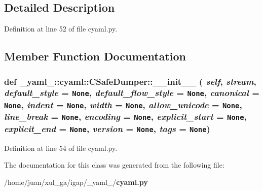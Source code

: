 \subsection{Detailed Description}


Definition at line 52 of file cyaml.py.

\subsection{Member Function Documentation}
\subsubsection{\setlength{\rightskip}{0pt plus 5cm}def \_\-yaml\_\-::cyaml::CSafeDumper::\_\-\_\-init\_\-\_\- ( {\em self},  {\em stream},  {\em default\_\-style} = {\tt None},  {\em default\_\-flow\_\-style} = {\tt None},  {\em canonical} = {\tt None},  {\em indent} = {\tt None},  {\em width} = {\tt None},  {\em allow\_\-unicode} = {\tt None},  {\em line\_\-break} = {\tt None},  {\em encoding} = {\tt None},  {\em explicit\_\-start} = {\tt None},  {\em explicit\_\-end} = {\tt None},  {\em version} = {\tt None},  {\em tags} = {\tt None})}\label{class__yaml___1_1cyaml_1_1CSafeDumper_7b2402b5c51e5fc50b22a35727f86952}




Definition at line 54 of file cyaml.py.

The documentation for this class was generated from the following file:\begin{CompactItemize}
\item 
/home/juan/xul\_\-ga/igap/\_\-yaml\_\-/{\bf cyaml.py}\end{CompactItemize}
